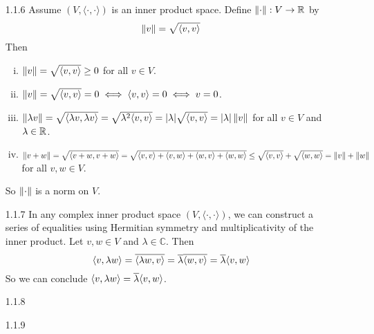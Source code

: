 \documentclass[../../Solutions.tex]{subfiles}
\begin{document}
\begin{itemize}
	\item [1.1.6] Assume $(V,\langle\cdot,\cdot\rangle)$ is an inner product space.
	Define $\left\lVert\cdot\right\rVert:V \to \mathbb{R}$ by
	$$ \left\lVert v\right\rVert = \sqrt{\langle v,v \rangle} $$
	Then
	\begin{enumerate}[(i)]
		\item $\left\lVert v\right\rVert = \sqrt{\langle v,v \rangle} \geq 0$ for all $v \in V$.
		\item $\left\lVert v\right\rVert = \sqrt{\langle v,v \rangle} = 0 \iff \langle v,v \rangle = 0 \iff v = 0$.
		\item $\left\lVert\lambda v\right\rVert = \sqrt{\langle \lambda v,\lambda v \rangle} = \sqrt{\lambda^2\langle v,v \rangle} = |\lambda|\sqrt{\langle v,v \rangle} = |\lambda|\left\lVert v\right\rVert$ for all $v \in V$ and $\lambda \in \mathbb{R}$.
		\item $\left\lVert v+w\right\rVert = \sqrt{\langle v+w,v+w \rangle} = \sqrt{\langle v,v \rangle + \langle v,w \rangle + \langle w,v \rangle + \langle w,w \rangle} \leq \sqrt{\langle v,v \rangle} + \sqrt{\langle w,w \rangle} = \left\lVert v\right\rVert+\left\lVert w\right\rVert$ for all $v,w \in V$.
	\end{enumerate}
	So $\left\lVert\cdot\right\rVert$ is a norm on $V$.
	
	\item [1.1.7] In any complex inner product space $(V,\langle\cdot,\cdot\rangle)$, we can construct a series of equalities using Hermitian symmetry and multiplicativity of the inner product.
	Let $v,w \in V$ and $\lambda \in \mathbb{C}$. Then
	$$ \langle v,\lambda w \rangle = \overline{\langle \lambda w,v \rangle} = \overline{\lambda} \overline{\langle w,v \rangle} = \overline{\lambda}\langle v,w \rangle $$
	So we can conclude $\langle v,\lambda w \rangle = \overline{\lambda}\langle v,w \rangle$.
	
	\item [1.1.8]
	
	\item [1.1.9]
\end{itemize}
\end{document}
